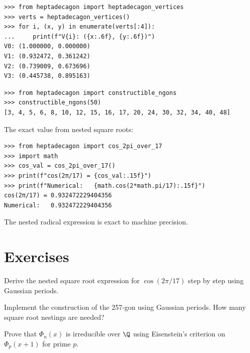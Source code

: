 \begin{example}
\begin{lstlisting}[style=python]
>>> from heptadecagon import heptadecagon_vertices
>>> verts = heptadecagon_vertices()
>>> for i, (x, y) in enumerate(verts[:4]):
...     print(f"V{i}: ({x:.6f}, {y:.6f})")
V0: (1.000000, 0.000000)
V1: (0.932472, 0.361242)
V2: (0.739009, 0.673696)
V3: (0.445738, 0.895163)
\end{lstlisting}
\end{example}

\begin{example}
\begin{lstlisting}[style=python]
>>> from heptadecagon import constructible_ngons
>>> constructible_ngons(50)
[3, 4, 5, 6, 8, 10, 12, 15, 16, 17, 20, 24, 30, 32, 34, 40, 48]
\end{lstlisting}
\end{example}

\begin{example}
The exact value from nested square roots:
\begin{lstlisting}[style=python]
>>> from heptadecagon import cos_2pi_over_17
>>> import math
>>> cos_val = cos_2pi_over_17()
>>> print(f"cos(2π/17) = {cos_val:.15f}")
>>> print(f"Numerical:   {math.cos(2*math.pi/17):.15f}")
cos(2π/17) = 0.932472229404356
Numerical:   0.932472229404356
\end{lstlisting}
The nested radical expression is exact to machine precision.
\end{example}

\section{Exercises}

\begin{exercise}
Derive the nested square root expression for $\cos(2\pi/17)$ step by step using Gaussian periods.
\end{exercise}

\begin{exercise}
Implement the construction of the 257-gon using Gaussian periods. How many square root nestings are needed?
\end{exercise}

\begin{exercise}
Prove that $\Phi_n(x)$ is irreducible over $\Q$ using Eisenstein's criterion  on $\Phi_p(x+1)$ for prime $p$.
\end{exercise}

